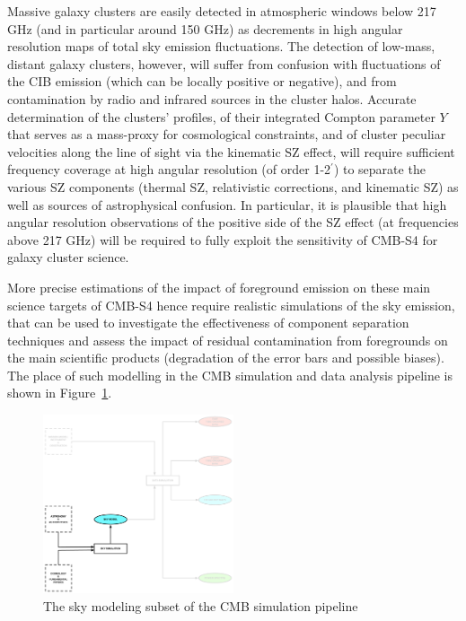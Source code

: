 Massive galaxy clusters are easily detected in atmospheric windows below 217 GHz (and in particular around 150 GHz) as decrements in high angular resolution maps of total sky emission fluctuations. The detection of low-mass, distant galaxy clusters, however, will suffer from confusion with fluctuations of the CIB emission (which can be locally positive or negative), and from contamination by radio and infrared sources in the cluster halos. Accurate determination of the clusters' profiles, of their integrated Compton parameter $Y$ that serves as a mass-proxy for cosmological constraints, and of cluster peculiar velocities along the line of sight via the kinematic SZ effect, will require sufficient frequency coverage at high angular resolution (of order 1-2$^\prime$) to separate the various SZ components (thermal SZ, relativistic corrections, and kinematic SZ) as well as sources of astrophysical confusion. In particular, it is plausible that high angular resolution observations of the positive side of the SZ effect (at frequencies above 217 GHz) will be required to fully exploit the sensitivity of CMB-S4 for galaxy cluster science.

More precise estimations of the impact of foreground emission on these main science targets of CMB-S4 hence require realistic simulations of the sky emission, that can be used to investigate the effectiveness of component separation techniques and assess the impact of residual contamination from foregrounds on the main scientific products (degradation of the error bars and possible biases). The place of such modelling in the CMB simulation and data analysis pipeline is shown in Figure~\ref{fig:skymodel-in-pipeline}.

\begin{figure}[htbp]
\centering
\includegraphics[width=0.5\textwidth]{Analysis/sm}
\caption{The sky modeling subset of the CMB simulation pipeline}
\label{fig:skymodel-in-pipeline}
\end{figure}

